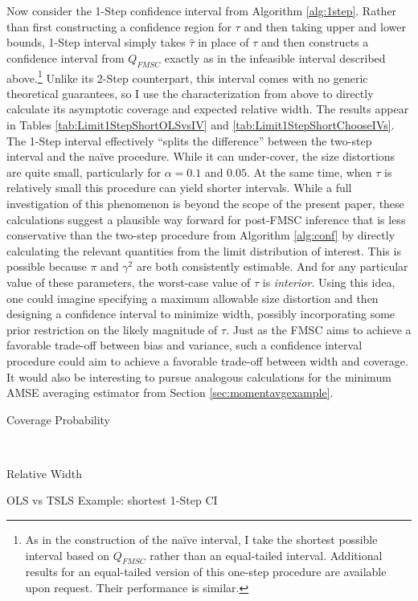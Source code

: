 Now consider the 1-Step confidence interval from Algorithm \ref{alg:1step}. 
Rather than first constructing a confidence region for $\tau$ and then taking upper and lower bounds, 1-Step interval simply takes $\widehat{\tau}$ in place of $\tau$ and then constructs a confidence interval from $Q_{FMSC}$ exactly as in the infeasible interval described above.\footnote{As in the construction of the na\"{i}ve interval, I take the shortest possible interval based on $Q_{FMSC}$ rather than an equal-tailed interval. Additional results for an equal-tailed version of this one-step procedure are available upon request. Their performance is similar.}
Unlike its 2-Step counterpart, this interval comes with no generic theoretical guarantees, so I use the characterization from above to directly calculate its asymptotic coverage and expected relative width.
The results appear in Tables \ref{tab:Limit1StepShortOLSvsIV} and \ref{tab:Limit1StepShortChooseIVs}.
The 1-Step interval effectively ``splits the difference'' between the two-step interval and the na\"{i}ve procedure. 
While it can under-cover, the size distortions are quite small, particularly for $\alpha=0.1$ and $0.05$.
At the same time, when $\tau$ is relatively small this procedure can yield shorter intervals.
While a full investigation of this phenomenon is beyond the scope of the present paper, these calculations suggest a plausible way forward for post-FMSC inference that is less conservative than the two-step procedure from Algorithm \ref{alg:conf} by directly calculating the relevant quantities from the limit distribution of interest.
This is possible because $\pi$ and $\gamma^2$ are both consistently estimable.
And for any particular value of these parameters, the worst-case value of $\tau$ is \emph{interior}.
Using this idea, one could imagine specifying a maximum allowable size distortion and then designing a confidence interval to minimize width, possibly incorporating some prior restriction on the likely magnitude of $\tau$.
Just as the FMSC aims to achieve a favorable trade-off between bias and variance, such a confidence interval procedure could aim to achieve a favorable trade-off between width and coverage.
It would also be interesting to pursue analogous calculations for the minimum AMSE averaging estimator from Section \ref{sec:momentavgexample}.


\begin{table}[h]
  \footnotesize
  \centering
  \begin{subtable}{0.48\textwidth}
    \caption{Coverage Probability}
    
  \end{subtable}
  ~
  \begin{subtable}{0.48\textwidth}
    \caption{Relative Width}
    
  \end{subtable}
  \caption{OLS vs TSLS Example: shortest 1-Step CI} 
  \label{tab:Limit1StepShortOLSvsIV}
\end{table}


